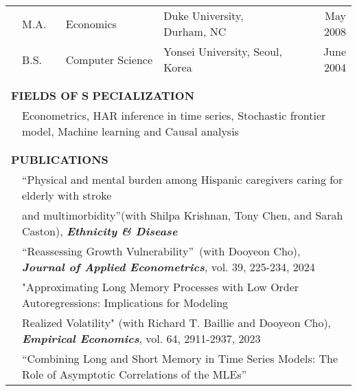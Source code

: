\documentclass[10pt]{article}
\begin{document}
\begin{center}
\begin{tabular}{llllr}
&\multicolumn{1}{l}{M.A.} & \multicolumn{1}{l}{Economics}& \multicolumn{1}{l}{Duke University, Durham, NC} & \multicolumn{1}{r}{May 2008} \\
&\multicolumn{1}{l}{B.S.} & \multicolumn{1}{l}{Computer Science}& \multicolumn{1}{l}{Yonsei University, Seoul, Korea} & \multicolumn{1}{r}{June 2004} \\
\multicolumn{5}{p{460pt}}{}\\\\
\multicolumn{5}{l}{{\Large \textbf{F}}\textbf{IELDS OF} {\Large \textbf{S}}%
\textbf{PECIALIZATION}} \vspace{0.1cm}\\
& \multicolumn{4}{l}{Econometrics, HAR inference in time series, Stochastic frontier model, Machine learning and Causal analysis} \\
\multicolumn{5}{p{460pt}}{}\\\\
\multicolumn{5}{l}{{\Large \textbf{P}}\textbf{UBLICATIONS}} \vspace{0.1cm}\\
& \multicolumn{4}{l}{\textquotedblleft Physical and mental burden among Hispanic caregivers caring for elderly with stroke }\\
& \multicolumn{4}{l}{and multimorbidity\textquotedblright  (with Shilpa Krishnan, Tony Chen, and Sarah Caston), {\bf\emph {Ethnicity \& Disease}}} \\
& \multicolumn{4}{l}{\textquotedblleft Reassessing Growth Vulnerability\textquotedblright \ (with Dooyeon Cho), {\bf\emph {Journal of Applied Econometrics}}, vol. 39, 225-234, 2024} \vspace{0.1cm}\\
& \multicolumn{4}{l}{"Approximating Long Memory Processes with Low Order Autoregressions: Implications for Modeling}\vspace{0.1cm}\\
& \multicolumn{4}{l}{Realized Volatility" (with Richard T. Baillie and Dooyeon Cho),  {\bf \emph{Empirical Economics}}, vol. 64, 2911-2937, 2023} \vspace{0.1cm}\\
& \multicolumn{4}{l}{\textquotedblleft Combining Long and Short Memory in Time Series Models: The Role of Asymptotic Correlations of the MLEs\textquotedblright \ }\\

\end{tabular}
\end{center}
\end{document}
